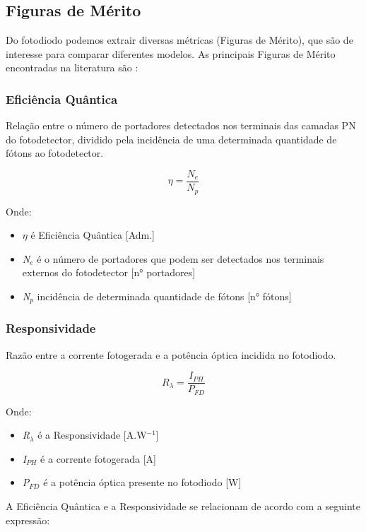 \subsection{Figuras de M\'erito}
Do fotodiodo podemos extrair diversas m\'etricas (Figuras de M\'erito), que são de interesse para comparar diferentes modelos. As principais Figuras de M\'erito encontradas na literatura são \cite{LidianeCampos}:
\subsubsection{Eficiência Quântica}
Relação entre o número de portadores detectados nos terminais das camadas PN do fotodetector, dividido pela incidência de uma determinada quantidade de fótons ao fotodetector.

\begin{equation}
    \eta = \frac{N_e}{N_p}
\end{equation}

Onde:
\begin{itemize}
    \item \emph{$\eta$} \'e Efici\^encia Qu\^antica [Adm.]
    \item \emph{N$_e$} \'e o n\'umero de portadores que podem ser detectados nos terminais externos do fotodetector [n° portadores]
    \item \emph{N$_p$} incid\^encia de determinada quantidade de f\'otons [n° f\'otons]
\end{itemize}

\subsubsection{Responsividade}
Razão entre a corrente fotogerada e a potência óptica incidida no fotodiodo.

\begin{equation}
    \label{eq_responsividade}
    R_\lambda = \frac{I_{PH}}{P_{FD}}
\end{equation}

Onde:
\begin{itemize}
    \item \emph{R$_\lambda$} \'e a Responsividade [A.W$^{-1}$]
    \item \emph{I$_{PH}$} \'e a corrente fotogerada [A]
    \item \emph{P$_{FD}$} \'e a pot\^encia \'optica presente no fotodiodo [W]
\end{itemize}

A Eficiência Quântica e a Responsividade se relacionam de acordo com a seguinte expressão:

